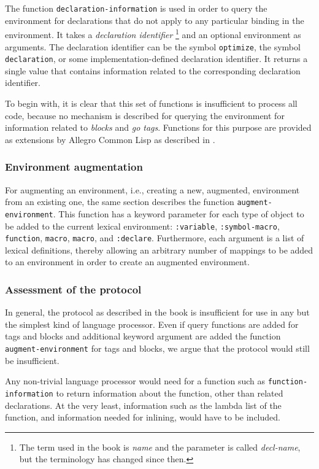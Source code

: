 The function \texttt{declaration-information} is used in order to
query the environment for declarations that do not apply to any
particular binding in the environment.  It takes a \emph{declaration
  identifier}%
\footnote{The term used in the book is \emph{name} and the parameter
  is called \textit{decl-name}, but the terminology has changed since
  then.} 
and an optional environment as arguments.  The declaration identifier
can be the symbol \texttt{optimize}, the symbol \texttt{declaration},
or some implementation-defined declaration identifier.  It returns a
single value that contains information related to the corresponding
declaration identifier.

To begin with, it is clear that this set of functions is insufficient
to process all \commonlisp{} code, because no mechanism is described
for querying the environment for information related to \emph{blocks}
and \emph{go tags}.  Functions for this purpose are provided as
extensions by Allegro Common Lisp as described in
.

\subsubsection{Environment augmentation}

For augmenting an environment, i.e., creating a new, augmented,
environment from an existing one, the same section describes the
function \texttt{augment-environment}.  This function has a keyword
parameter for each type of object to be added to the current lexical
environment: \texttt{:variable}, \texttt{:symbol-macro},
\texttt{function}, \texttt{macro}, \texttt{macro}, and
\texttt{:declare}.  Furthermore, each argument is a list of lexical
definitions, thereby allowing an arbitrary number of mappings to be
added to an environment in order to create an augmented environment.

\subsubsection{Assessment of the protocol}

In general, the protocol as described in the book is insufficient for
use in any but the simplest kind of language processor.  Even if
query functions are added for tags and blocks and additional keyword
argument are added the function \texttt{augment-environment} for tags
and blocks, we argue that the protocol would still be insufficient.

Any non-trivial language processor would need for a function such as
\texttt{function-information} to return information about the
function, other than related declarations.  At the very least,
information such as the lambda list of the function, and information
needed for inlining, would have to be included.


